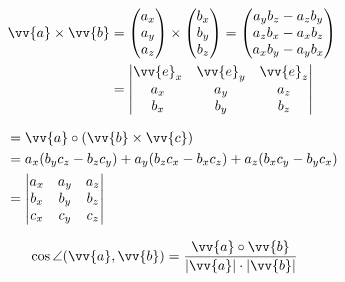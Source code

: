 \begin{boxleft}
\\
\end{boxleft}\begin{boxrightshaded}
\begin{align} 
\vv{a}\times\vv{b} &= \begin{pmatrix}a_x\\ a_y\\a_z\end{pmatrix}\times\begin{pmatrix}b_x\\ b_y\\b_z\end{pmatrix}=\begin{pmatrix}a_yb_z-a_zb_y\\ a_zb_x-a_xb_z\\a_xb_y-a_yb_x\end{pmatrix}\\
		  &=\begin{vmatrix}\vv{e}_x&\vv{e}_y&\vv{e}_z\\a_x&a_y&a_z\\b_x&b_y&b_z\end{vmatrix}
\end{align}\end{boxrightshaded}

\begin{boxleft}
\end{boxleft}\begin{boxrightshaded}
\begin{align} 
[\vv{a}\vv{b}\vv{c}]  &=\vv{a}\circ(\vv{b}\times\vv{c})\\
		      &=a_x(b_yc_z-b_zc_y)+a_y(b_zc_x-b_xc_z)+a_z(b_xc_y-b_yc_x)\\
		      &=\begin{vmatrix}a_x&a_y&a_z\\b_x&b_y&b_z\\c_x&c_y&c_z\end{vmatrix}
\end{align}\end{boxrightshaded}

\begin{boxleft}
\end{boxleft}\begin{boxrightshaded}
\begin{align} 
\cos\angle(\vv{a},\vv{b})&=\frac{\vv{a}\circ\vv{b}}{|\vv{a}|\cdot|\vv{b}|}
\end{align}\end{boxrightshaded}

